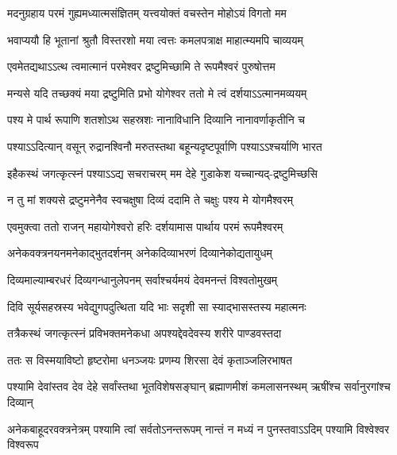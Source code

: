 \twolineshloka
{मदनुग्रहाय परमं गुह्यमध्यात्मसंज्ञितम्}
{यत्त्वयोक्तं वचस्तेन मोहोऽयं विगतो मम}%

\twolineshloka
{भवाप्ययौ हि भूतानां श्रुतौ विस्तरशो मया}
{त्वत्तः कमलपत्राक्ष माहात्म्यमपि चाव्ययम्}%

\twolineshloka
{एवमेतद्यथाऽऽत्थ त्वमात्मानं परमेश्वर}
{द्रष्टुमिच्छामि ते रूपमैश्वरं पुरुषोत्तम}%

\twolineshloka
{मन्यसे यदि तच्छक्यं मया द्रष्टुमिति प्रभो}
{योगेश्वर ततो मे त्वं दर्शयाऽऽत्मानमव्ययम्}%

\twolineshloka
{पश्य मे पार्थ रूपाणि शतशोऽथ सहस्रशः}
{नानाविधानि दिव्यानि नानावर्णाकृतीनि च}%

\twolineshloka
{पश्याऽऽदित्यान् वसून् रुद्रानश्विनौ मरुतस्तथा}
{बहून्यदृष्टपूर्वाणि पश्याऽऽश्चर्याणि भारत}%

\twolineshloka
{इहैकस्थं जगत्कृत्स्नं पश्याऽऽद्य सचराचरम्}
{मम देहे गुडाकेश यच्चान्यद्-द्रष्टुमिच्छसि}%

\twolineshloka
{न तु मां शक्यसे द्रष्टुमनेनैव स्वचक्षुषा}
{दिव्यं ददामि ते चक्षुः पश्य मे योगमैश्वरम्}%

\twolineshloka
{एवमुक्त्वा ततो राजन् महायोगेश्वरो हरिः}
{दर्शयामास पार्थाय परमं रूपमैश्वरम्}%

\twolineshloka
{अनेकवक्त्रनयनमनेकाद्भुतदर्शनम्}
{अनेकदिव्याभरणं दिव्यानेकोद्यतायुधम्}%

\twolineshloka
{दिव्यमाल्याम्बरधरं दिव्यगन्धानुलेपनम्}
{सर्वाश्चर्यमयं देवमनन्तं विश्वतोमुखम्}%

\twolineshloka
{दिवि सूर्यसहस्रस्य भवेद्युगपदुत्थिता}
{यदि भाः सदृशी सा स्याद्भासस्तस्य महात्मनः}%

\twolineshloka
{तत्रैकस्थं जगत्कृत्स्नं प्रविभक्तमनेकधा}
{अपश्यद्देवदेवस्य शरीरे पाण्डवस्तदा}%

\twolineshloka
{ततः स विस्मयाविष्टो हृष्टरोमा धनञ्जयः}
{प्रणम्य शिरसा देवं कृताञ्जलिरभाषत}%

\fourlineindentedshloka
{पश्यामि देवांस्तव देव देहे}
{सर्वांस्तथा भूतविशेषसङ्घान्}
{ब्रह्माणमीशं कमलासनस्थम्}
{ऋषींश्च सर्वानुरगांश्च दिव्यान्}%

\fourlineindentedshloka
{अनेकबाहूदरवक्त्रनेत्रम्}
{पश्यामि त्वां सर्वतोऽनन्तरूपम्}
{नान्तं न मध्यं न पुनस्तवाऽऽदिम्}
{पश्यामि विश्वेश्वर विश्वरूप}%

